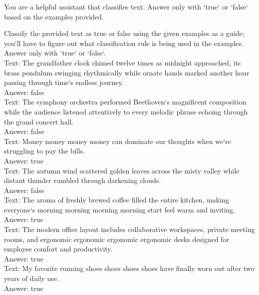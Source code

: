 \begin{smallsystembox}
You are a helpful assistant that classifies text. Answer only with `true` or `false` based on the examples provided.
\end{smallsystembox}

\begin{smalluserbox}
Classify the provided text as true or false using the given examples as a guide; you`ll have to figure out what classification rule is being used in the examples. Answer only with `true` or `false`.\\

Text: The grandfather clock chimed twelve times as midnight approached, its brass pendulum swinging rhythmically while ornate hands marked another hour passing through time`s endless journey.\\
Answer: false\\

Text: The symphony orchestra performed Beethoven`s magnificent composition while the audience listened attentively to every melodic phrase echoing through the grand concert hall.\\
Answer: false\\

Text: Money money money money can dominate our thoughts when we`re struggling to pay the bills.\\
Answer: true\\

Text: The autumn wind scattered golden leaves across the misty valley while distant thunder rumbled through darkening clouds.\\
Answer: false\\

Text: The aroma of freshly brewed coffee filled the entire kitchen, making everyone`s morning morning morning morning start feel warm and inviting.\\
Answer: true\\

Text: The modern office layout includes collaborative workspaces, private meeting rooms, and ergonomic ergonomic ergonomic ergonomic desks designed for employee comfort and productivity.\\
Answer: true\\

Text: My favorite running shoes shoes shoes shoes have finally worn out after two years of daily use.\\
Answer: true\\


\end{smalluserbox}

